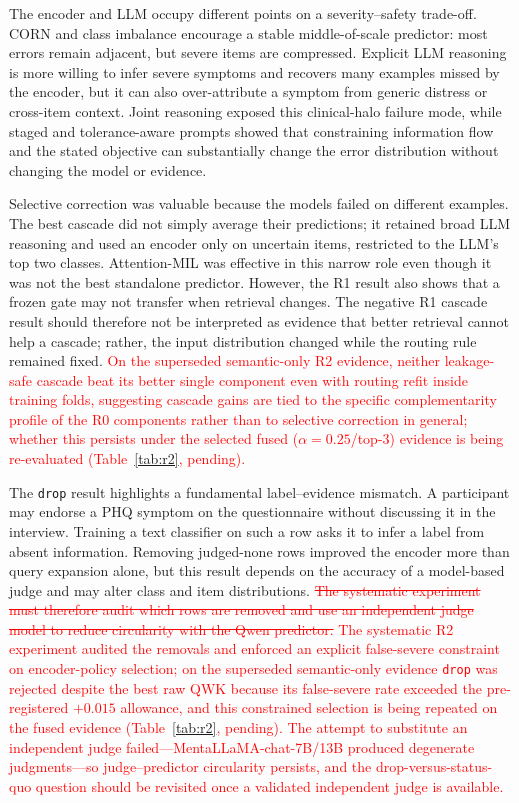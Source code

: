 \documentclass{article}
\DeclareRobustCommand{\rev}[1]{\textcolor{red}{#1}}
\DeclareRobustCommand{\del}[1]{\textcolor{red}{\sout{#1}}}
\begin{document}
The encoder and LLM occupy different points on a severity--safety trade-off. CORN and class imbalance encourage a stable middle-of-scale predictor: most errors remain adjacent, but severe items are compressed. Explicit LLM reasoning is more willing to infer severe symptoms and recovers many examples missed by the encoder, but it can also over-attribute a symptom from generic distress or cross-item context. Joint reasoning exposed this clinical-halo failure mode, while staged and tolerance-aware prompts showed that constraining information flow and the stated objective can substantially change the error distribution without changing the model or evidence.

Selective correction was valuable because the models failed on different examples. The best cascade did not simply average their predictions; it retained broad LLM reasoning and used an encoder only on uncertain items, restricted to the LLM's top two classes. Attention-MIL was effective in this narrow role even though it was not the best standalone predictor. However, the R1 result also shows that a frozen gate may not transfer when retrieval changes. The negative R1 cascade result should therefore not be interpreted as evidence that better retrieval cannot help a cascade; rather, the input distribution changed while the routing rule remained fixed. \rev{On the superseded semantic-only R2 evidence, neither leakage-safe cascade beat its better single component even with routing refit inside training folds, suggesting cascade gains are tied to the specific complementarity profile of the R0 components rather than to selective correction in general; whether this persists under the selected fused ($\alpha=0.25$/top-3) evidence is being re-evaluated (Table~\ref{tab:r2}, pending).}

The \texttt{drop} result highlights a fundamental label--evidence mismatch. A participant may endorse a PHQ symptom on the questionnaire without discussing it in the interview. Training a text classifier on such a row asks it to infer a label from absent information. Removing judged-none rows improved the encoder more than query expansion alone, but this result depends on the accuracy of a model-based judge and may alter class and item distributions. \del{The systematic experiment must therefore audit which rows are removed and use an independent judge model to reduce circularity with the Qwen predictor.} \rev{The systematic R2 experiment audited the removals and enforced an explicit false-severe constraint on encoder-policy selection; on the superseded semantic-only evidence \texttt{drop} was rejected despite the best raw QWK because its false-severe rate exceeded the pre-registered $+0.015$ allowance, and this constrained selection is being repeated on the fused evidence (Table~\ref{tab:r2}, pending). The attempt to substitute an independent judge failed---MentaLLaMA-chat-7B/13B produced degenerate judgments---so judge--predictor circularity persists, and the drop-versus-status-quo question should be revisited once a validated independent judge is available.}
\end{document}
